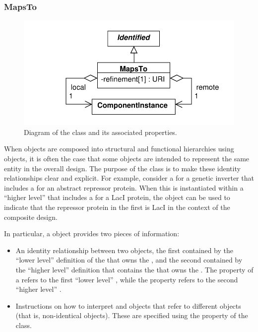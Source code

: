 
\subsubsection{MapsTo}
\label{sec:MapsTo}

\begin{figure}[ht]
\begin{center}
\includegraphics[scale=0.6]{uml/maps_to}
\caption[]{Diagram of the  class and its associated properties.}
\label{uml:maps_to}
\end{center}
\end{figure}

When  objects are composed into structural and functional hierarchies using  objects, it is often the case that some  objects are intended to represent the same entity in the overall design. The purpose of the  class is to make these identity relationships clear and explicit.  For example, consider a  for a genetic inverter that includes a  for an abstract repressor protein.  When this  is instantiated within a ``higher level''  that includes a  for a LacI protein, the  object can be used to indicate that the repressor protein in the first  is LacI in the context of the composite design.

In particular, a  object provides two pieces of information:
\begin{itemize}
\item An identity relationship between two  objects, the first contained by the ``lower level'' definition of the  that owns the
  , and the second contained by the ``higher level'' definition that contains the  that owns the . The  property of a  refers to the first ``lower level'' , while the  property refers to the second ``higher level'' .
\item Instructions on how to interpret  and   objects that refer to different  objects (that is, non-identical objects). These are specified using the  property of the  class.
\end{itemize}

